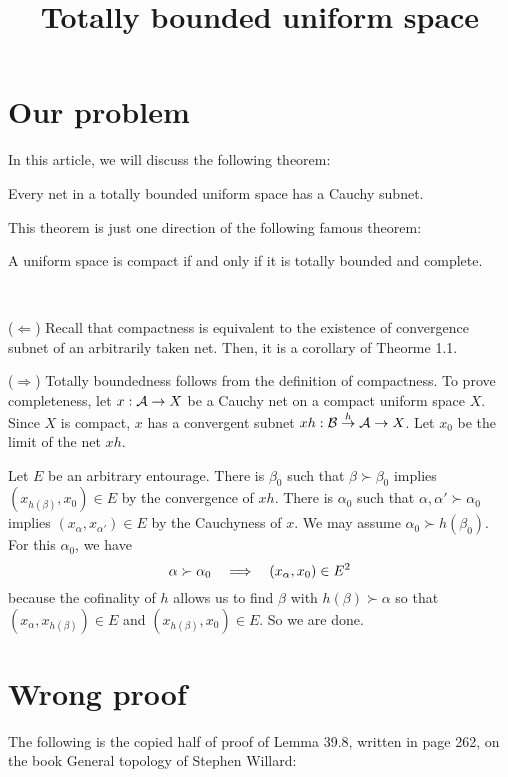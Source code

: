 \documentclass{../exp}
\title{Totally bounded uniform space}
\begin{document}
\maketitle

\section{Our problem}
In this article, we will discuss the following theorem:
\begin{thm}
Every net in a totally bounded uniform space has a Cauchy subnet.
\end{thm}
This theorem is just one direction of the following famous theorem:
\begin{thm}
A uniform space is compact if and only if it is totally bounded and complete.
\end{thm}
\begin{pf}\,

($\Leftarrow$)
Recall that compactness is equivalent to the existence of convergence subnet of an arbitrarily taken net.
Then, it is a corollary of Theorme 1.1.

($\Rightarrow$)
Totally boundedness follows from the definition of compactness.
To prove completeness, let $x:\cA\to X$ be a Cauchy net on a compact uniform space $X$.
Since $X$ is compact, $x$ has a convergent subnet $xh:\cB\to{h}\cA\to X$.
Let $x_0$ be the limit of the net $xh$.

Let $E$ be an arbitrary entourage.
There is $\beta_0$ such that $\beta\succ\beta_0$ implies $(x_{h(\beta)},x_0)\in E$ by the convergence of $xh$.
There is $\alpha_0$ such that $\alpha,\alpha'\succ\alpha_0$ implies $(x_\alpha,x_{\alpha'})\in E$ by the Cauchyness of $x$.
We may assume $\alpha_0\succ h(\beta_0)$.
For this $\alpha_0$, we have
\[\alpha\succ\alpha_0\impl(x_\alpha,x_0)\in E^2\]
because the cofinality of $h$ allows us to find $\beta$ with $h(\beta)\succ\alpha$ so that $(x_\alpha,x_{h(\beta)})\in E$ and $(x_{h(\beta)},x_0)\in E$.
So we are done.
\end{pf}


\section{Wrong proof}
The following is the copied half of proof of Lemma 39.8, written in page 262, on the book General topology of Stephen Willard:
\bigskip
\end{document}
